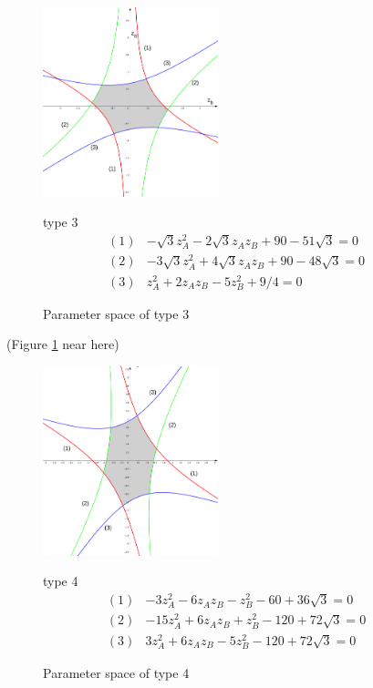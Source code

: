 \documentclass[suppldata, dvipdfmx]{interact}
\theoremstyle{plain}%
\theoremstyle{definition}
\theoremstyle{remark}
\theoremstyle{problemstyle}
\begin{document}
\begin{figure}[h!tbp]
 \begin{minipage}[]{0.5\textwidth}
 \centering
 \includegraphics[width=2in,
 keepaspectratio]{./img/graph/cubeC.jpg}
 \caption{Parameter space of type 3}
 \label{fig:graphCubeC}
 \end{minipage}
 \hspace*{\fill}
 \begin{minipage}[]{0.5\textwidth}
  \centering
  type 3
  \begin{align*}
   (1)& -\sqrt{3}z_A^2 - 2\sqrt{3}z_Az_B + 90 - 51\sqrt{3} = 0\\
   (2)& -3\sqrt{3}z_A^2 + 4\sqrt{3}z_A z_B + 90 - 48\sqrt{3} = 0\\
   (3)& z_A^2 + 2 z_A z_B - 5z_B^2 + 9/4 = 0
  \end{align*}
 \end{minipage}
 \hspace*{\fill}
\end{figure}

\noindent(Figure \ref{fig:graphCubeC} near here)

\begin{figure}[h!tbp]
 \begin{minipage}[]{0.5\textwidth}
 \centering
 \includegraphics[width=2in,
 keepaspectratio]{./img/graph/cubeD.jpg}
 \caption{Parameter space of type 4}
 \label{fig:graphCubeD}
 \end{minipage}
 \hspace*{\fill}
 \begin{minipage}[]{0.5\textwidth}
  \centering
  type 4
  \begin{align*}
   (1)& -3z_A^2 - 6z_A z_B - z_B^2 -60 +36\sqrt{3} = 0\\
   (2)& -15 z_A^2 + 6z_Az_B + z_B^2 - 120 + 72\sqrt{3} = 0\\
   (3)& 3z_A^2 + 6z_Az_B - 5z_B^2 - 120 + 72 \sqrt{3} = 0
  \end{align*}
 \end{minipage}
 \hspace*{\fill}
\end{figure}
\end{document}

